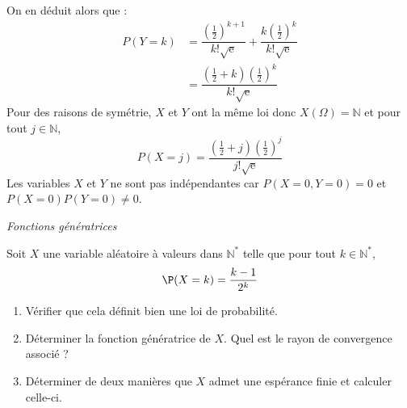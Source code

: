 \documentclass[a4paper,10pt]{report}
\begin{document}
On en déduit alors que :
\begin{align*}
P(Y=k) & =\dfrac{\left(\tfrac{1}{2} \right)^{k+1}}{k!\sqrt{\mathrm{e}}}+\dfrac{k\left(\tfrac{1}{2} \right)^{k}}{k!\sqrt{\mathrm{e}}} \\
&= \dfrac{(\tfrac{1}{2}+k)\left(\tfrac{1}{2} \right)^{k}}{k!\sqrt{\mathrm{e}}}
\end{align*}
Pour des raisons de symétrie, $X$ et $Y$ ont la même loi donc $X(\Omega)=\mathbb{N}$ et pour tout $ j \in {\mathbb{N}}$, 
$$P(X=j)=\dfrac{(\tfrac{1}{2}+j)\left(\tfrac{1}{2} \right)^{j}}{j!\sqrt{\mathrm{e}}}$$
Les variables $X$ et $Y$ ne sont pas indépendantes car $P(X=0,Y=0)=0$ et $P(X=0)P(Y=0)\neq 0$.

\medskip

\begin{center}
\textit{{ {\large Fonctions génératrices}}}
\end{center}

\medskip

\begin{Exercice}{}  Soit $X$ une variable aléatoire à valeurs dans $\mathbb{N}^*$ telle que pour tout $k \in \mathbb{N}^*$,
$$ \P(X=k) = \dfrac{k-1}{2^k}$$

\begin{enumerate}
\item Vérifier que cela définit bien une loi de probabilité.
\item Déterminer la fonction génératrice de $X$. Quel est le rayon de convergence associé ?
\item Déterminer de deux manières que $X$ admet une espérance finie et calculer celle-ci.
\end{enumerate}
\end{Exercice}

\corr 
\end{document}

